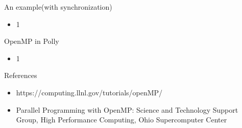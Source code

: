 \documentclass[14pt]{beamer}
\begin{document}
\begin{frame}{An example(with synchronization)}
\begin{itemize}
\item 1
\end{itemize}
\end{frame}

\begin{frame}{OpenMP in Polly}
\begin{itemize}
\item 1
\end{itemize}
\end{frame}


\begin{frame}{References}
\begin{itemize}
\item https://computing.llnl.gov/tutorials/openMP/
\item Parallel Programming with OpenMP: Science and Technology Support Group, High Performance Computing, Ohio Supercomputer Center
\end{itemize}
\end{frame}
\end{document}
